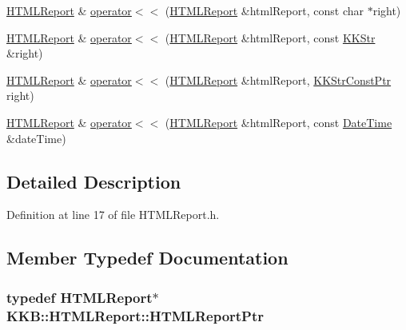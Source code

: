 \begin{DoxyCompactItemize}
\hyperlink{class_k_k_b_1_1_h_t_m_l_report}{H\+T\+M\+L\+Report} \& \hyperlink{class_k_k_b_1_1_h_t_m_l_report_a33179b16e3b64d155363e60e5572a756}{operator$<$$<$} (\hyperlink{class_k_k_b_1_1_h_t_m_l_report}{H\+T\+M\+L\+Report} \&html\+Report, const char $\ast$right)
\item 
\hyperlink{class_k_k_b_1_1_h_t_m_l_report}{H\+T\+M\+L\+Report} \& \hyperlink{class_k_k_b_1_1_h_t_m_l_report_a7c8f0ea935cbe307cd4527504a4b69d2}{operator$<$$<$} (\hyperlink{class_k_k_b_1_1_h_t_m_l_report}{H\+T\+M\+L\+Report} \&html\+Report, const \hyperlink{class_k_k_b_1_1_k_k_str}{K\+K\+Str} \&right)
\item 
\hyperlink{class_k_k_b_1_1_h_t_m_l_report}{H\+T\+M\+L\+Report} \& \hyperlink{class_k_k_b_1_1_h_t_m_l_report_a0dac276089dfdd120e00587ff1b72d0b}{operator$<$$<$} (\hyperlink{class_k_k_b_1_1_h_t_m_l_report}{H\+T\+M\+L\+Report} \&html\+Report, \hyperlink{namespace_k_k_b_a46f665ec17615c856eff3d21f78bed5c}{K\+K\+Str\+Const\+Ptr} right)
\item 
\hyperlink{class_k_k_b_1_1_h_t_m_l_report}{H\+T\+M\+L\+Report} \& \hyperlink{class_k_k_b_1_1_h_t_m_l_report_ad9a8d61435b3a1c1dc70663f83af8251}{operator$<$$<$} (\hyperlink{class_k_k_b_1_1_h_t_m_l_report}{H\+T\+M\+L\+Report} \&html\+Report, const \hyperlink{class_k_k_b_1_1_date_time}{Date\+Time} \&date\+Time)
\end{DoxyCompactItemize}


\subsection{Detailed Description}


Definition at line 17 of file H\+T\+M\+L\+Report.\+h.



\subsection{Member Typedef Documentation}
\subsubsection[{\texorpdfstring{H\+T\+M\+L\+Report\+Ptr}{HTMLReportPtr}}]{\setlength{\rightskip}{0pt plus 5cm}typedef {\bf H\+T\+M\+L\+Report}$\ast$ {\bf K\+K\+B\+::\+H\+T\+M\+L\+Report\+::\+H\+T\+M\+L\+Report\+Ptr}}\hypertarget{class_k_k_b_1_1_h_t_m_l_report_a8b68e502b29c1e631f43ba1514bb4c67}{}\label{class_k_k_b_1_1_h_t_m_l_report_a8b68e502b29c1e631f43ba1514bb4c67}


